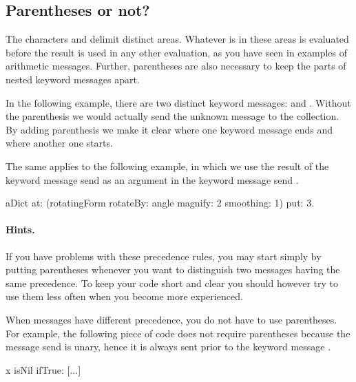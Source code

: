 \documentclass[a4paper,10pt,twoside]{book}
\begin{document}
\subsection{Parentheses or not?}
The characters \ct{[]} and \ct{()} delimit distinct areas.
Whatever is in these areas is evaluated before the result is used in any other evaluation, as you have seen in examples of arithmetic messages.
Further, parentheses are also necessary to keep the parts of nested keyword messages apart.

In the following example, there are two distinct keyword messages:  and .
Without the parenthesis we would actually send the unknown message  to the collection.
By adding parenthesis we make it clear where one keyword message ends and where another one starts.


The same applies to the following example, in which we use the result of the keyword message send  as an argument in the keyword message send .

\begin{code}{}
aDict
   at: (rotatingForm 
           rotateBy: angle	
           magnify: 2 
           smoothing: 1)
   put: 3.
\end{code}

\paragraph{Hints.}
If you have problems with these precedence rules, you may start simply by putting parentheses whenever you want to distinguish two messages having the same precedence.
To keep your code short and clear you should however try to use them less often when you become more experienced.

When messages have different precedence, you do not have to use parentheses.
For example, the following piece of code does not require parentheses because the message send  is unary, hence it is always sent prior to the keyword message .
\begin{code}{}
x isNil ifTrue: [...]
\end{code}

\end{document}
